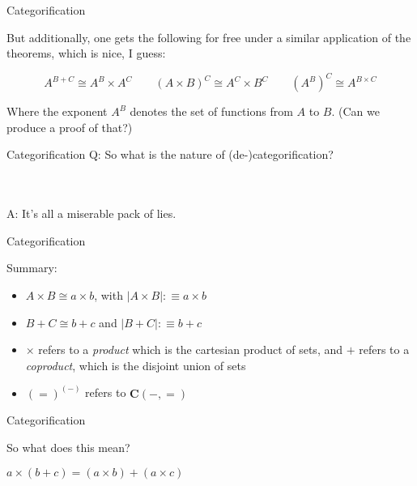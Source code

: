 \documentclass[tikz]{beamer}
\theoremstyle{definition}
\begin{document}
\begin{frame}{Categorification}

    But additionally, one gets the following for free under a similar application of the theorems, which is nice, I guess:
    
    \begin{block}{}
        \begin{equation*}
            A^{B + C} \cong A^B \times A^C \qquad (A \times B)^C \cong A^C \times B^C \qquad (A^B)^C \cong A^{B \times C}
        \end{equation*}{}
    \end{block}
    
    Where the exponent $A^B$ denotes the set of functions from $A$ to $B$. (Can we produce a proof of that?)
\end{frame}{}

\begin{frame}{Categorification}
    Q: So what is the nature of (de-)categorification? 
    
    \\
    
    \\A: It's all a miserable pack of lies.
\end{frame}{}

\begin{frame}{Categorification}

Summary: 

\begin{block}{}
\begin{itemize}
    \item $A \times B \cong a \times b$, with $|A \times B| :\equiv a \times b$
    \item $B + C \cong b + c$ and $|B + C| :\equiv b + c$
    \item $\times$ refers to a \textit{product} which is the cartesian product of sets, and $+$ refers to a \textit{coproduct}, which is the disjoint union of sets
    \item $(=)^{(-)}$ refers to $\mathbf{C}(-,=)$
\end{itemize}{}

\end{block}
\end{frame}{}

\begin{frame}{Categorification}
    
    So what does this mean?
    
    \begin{block}{}
        $a \times (b + c) = (a \times b) + (a \times c) $
    \end{block}{}
\end{frame}{}
\end{document}
